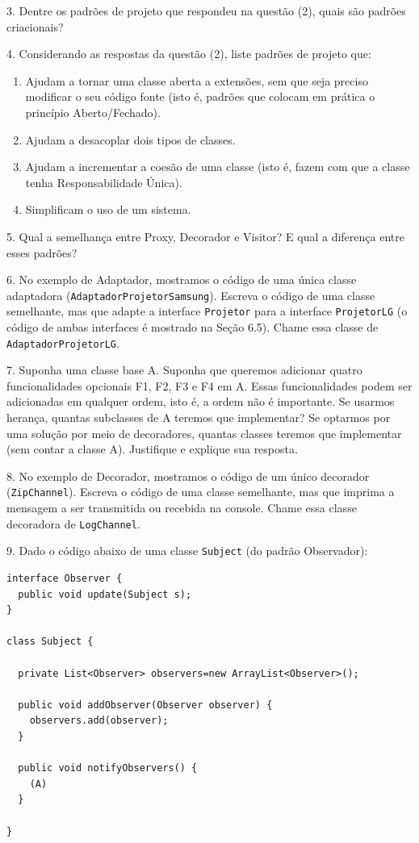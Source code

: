 \documentclass[
  11pt,
  twoside]{book}
\newcommand{\passthrough}[1]{#1}
\begin{document}
3. Dentre os padrões de projeto que respondeu na questão (2), quais são
padrões criacionais?

4. Considerando as respostas da questão (2), liste padrões de projeto
que:

\begin{enumerate}
\def\labelenumi{\alph{enumi})}
\item
  Ajudam a tornar uma classe aberta a extensões, sem que seja preciso
  modificar o seu código fonte (isto é, padrões que colocam em prática o
  princípio Aberto/Fechado).
\item
  Ajudam a desacoplar dois tipos de classes.
\item
  Ajudam a incrementar a coesão de uma classe (isto é, fazem com que a
  classe tenha Responsabilidade Única).
\item
  Simplificam o uso de um sistema.
\end{enumerate}

5. Qual a semelhança entre Proxy, Decorador e Visitor? E qual a
diferença entre esses padrões?

6. No exemplo de Adaptador, mostramos o código de uma única classe
adaptadora (\passthrough{\lstinline!AdaptadorProjetorSamsung!}). Escreva
o código de uma classe semelhante, mas que adapte a interface
\passthrough{\lstinline!Projetor!} para a interface
\passthrough{\lstinline!ProjetorLG!} (o código de ambas interfaces é
mostrado na Seção 6.5). Chame essa classe de
\passthrough{\lstinline!AdaptadorProjetorLG!}.

7. Suponha uma classe base A. Suponha que queremos adicionar quatro
funcionalidades opcionais F1, F2, F3 e F4 em A. Essas funcionalidades
podem ser adicionadas em qualquer ordem, isto é, a ordem não é
importante. Se usarmos herança, quantas subclasses de A teremos que
implementar? Se optarmos por uma solução por meio de decoradores,
quantas classes teremos que implementar (sem contar a classe A).
Justifique e explique sua resposta.

8. No exemplo de Decorador, mostramos o código de um único decorador
(\passthrough{\lstinline!ZipChannel!}). Escreva o código de uma classe
semelhante, mas que imprima a mensagem a ser transmitida ou recebida na
console. Chame essa classe decoradora de
\passthrough{\lstinline!LogChannel!}.

9. Dado o código abaixo de uma classe \passthrough{\lstinline!Subject!}
(do padrão Observador):

\begin{lstlisting}
interface Observer {
  public void update(Subject s);
}

class Subject {

  private List<Observer> observers=new ArrayList<Observer>();

  public void addObserver(Observer observer) {
    observers.add(observer);
  }

  public void notifyObservers() {
    (A)
  }

}
\end{lstlisting}
\end{document}
